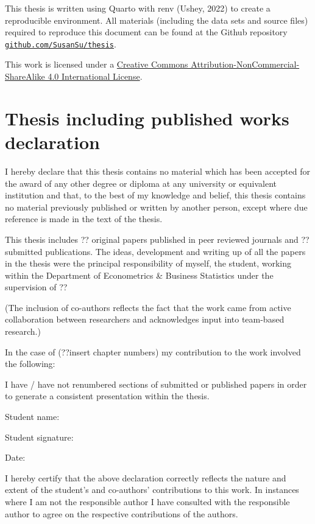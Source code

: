 \documentclass{monashthesis}
\begin{document}
This thesis is written using Quarto with renv (Ushey, 2022) to create a
reproducible environment. All materials (including the data sets and
source files) required to reproduce this document can be found at the
Github repository
\href{https://github.com/SusanSu/thesis}{\texttt{github.com/SusanSu/thesis}}.

This work is licensed under a
\href{http://creativecommons.org/licenses/by-nc-sa/4.0/}{Creative
Commons Attribution-NonCommercial-ShareAlike 4.0 International License}.

\hypertarget{thesis-including-published-works-declaration}{%
\section*{Thesis including published works
declaration}\label{thesis-including-published-works-declaration}}


I hereby declare that this thesis contains no material which has been
accepted for the award of any other degree or diploma at any university
or equivalent institution and that, to the best of my knowledge and
belief, this thesis contains no material previously published or written
by another person, except where due reference is made in the text of the
thesis.

This thesis includes ?? original papers published in peer reviewed
journals and ?? submitted publications. The ideas, development and
writing up of all the papers in the thesis were the principal
responsibility of myself, the student, working within the Department of
Econometrics \& Business Statistics under the supervision of ??

(The inclusion of co-authors reflects the fact that the work came from
active collaboration between researchers and acknowledges input into
team-based research.)

In the case of (??insert chapter numbers) my contribution to the work
involved the following:

I have / have not renumbered sections of submitted or published papers
in order to generate a consistent presentation within the thesis.

Student name:

Student signature:

Date:

I hereby certify that the above declaration correctly reflects the
nature and extent of the student's and co-authors' contributions to this
work. In instances where I am not the responsible author I have
consulted with the responsible author to agree on the respective
contributions of the authors.
\end{document}

